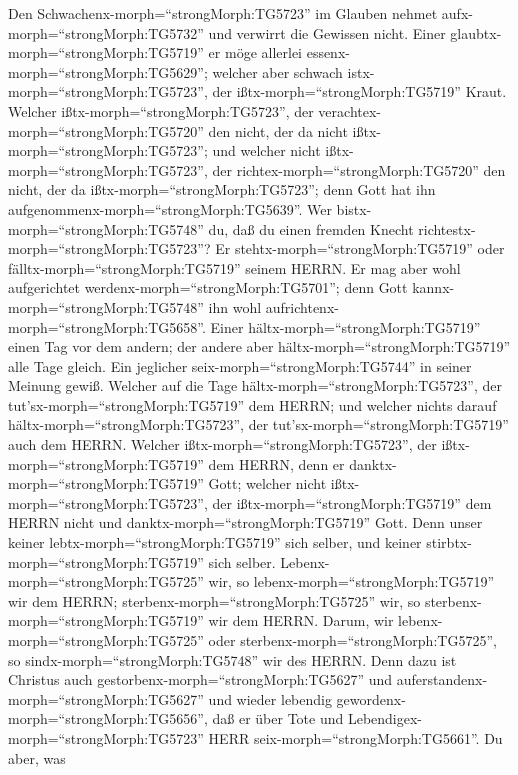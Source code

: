  Den Schwachenx-morph=``strongMorph:TG5723'' im Glauben
nehmet aufx-morph=``strongMorph:TG5732'' und verwirrt die Gewissen
nicht.  Einer glaubtx-morph=``strongMorph:TG5719'' er möge
allerlei essenx-morph=``strongMorph:TG5629''; welcher aber schwach
istx-morph=``strongMorph:TG5723'', der ißtx-morph=``strongMorph:TG5719''
Kraut.  Welcher ißtx-morph=``strongMorph:TG5723'', der
verachtex-morph=``strongMorph:TG5720'' den nicht, der da nicht
ißtx-morph=``strongMorph:TG5723''; und welcher nicht
ißtx-morph=``strongMorph:TG5723'', der
richtex-morph=``strongMorph:TG5720'' den nicht, der da
ißtx-morph=``strongMorph:TG5723''; denn Gott hat ihn
aufgenommenx-morph=``strongMorph:TG5639''.  Wer
bistx-morph=``strongMorph:TG5748'' du, daß du einen fremden Knecht
richtestx-morph=``strongMorph:TG5723''? Er
stehtx-morph=``strongMorph:TG5719'' oder
fälltx-morph=``strongMorph:TG5719'' seinem HERRN. Er mag aber wohl
aufgerichtet werdenx-morph=``strongMorph:TG5701''; denn Gott
kannx-morph=``strongMorph:TG5748'' ihn wohl
aufrichtenx-morph=``strongMorph:TG5658''.  Einer
hältx-morph=``strongMorph:TG5719'' einen Tag vor dem andern; der andere
aber hältx-morph=``strongMorph:TG5719'' alle Tage gleich. Ein jeglicher
seix-morph=``strongMorph:TG5744'' in seiner Meinung gewiß. 
Welcher auf die Tage hältx-morph=``strongMorph:TG5723'', der
tut'sx-morph=``strongMorph:TG5719'' dem HERRN; und welcher nichts darauf
hältx-morph=``strongMorph:TG5723'', der
tut'sx-morph=``strongMorph:TG5719'' auch dem HERRN. Welcher
ißtx-morph=``strongMorph:TG5723'', der ißtx-morph=``strongMorph:TG5719''
dem HERRN, denn er danktx-morph=``strongMorph:TG5719'' Gott; welcher
nicht ißtx-morph=``strongMorph:TG5723'', der
ißtx-morph=``strongMorph:TG5719'' dem HERRN nicht und
danktx-morph=``strongMorph:TG5719'' Gott.  Denn unser keiner
lebtx-morph=``strongMorph:TG5719'' sich selber, und keiner
stirbtx-morph=``strongMorph:TG5719'' sich selber. 
Lebenx-morph=``strongMorph:TG5725'' wir, so
lebenx-morph=``strongMorph:TG5719'' wir dem HERRN;
sterbenx-morph=``strongMorph:TG5725'' wir, so
sterbenx-morph=``strongMorph:TG5719'' wir dem HERRN. Darum, wir
lebenx-morph=``strongMorph:TG5725'' oder
sterbenx-morph=``strongMorph:TG5725'', so
sindx-morph=``strongMorph:TG5748'' wir des HERRN.  Denn dazu
ist Christus auch gestorbenx-morph=``strongMorph:TG5627'' und
auferstandenx-morph=``strongMorph:TG5627'' und wieder lebendig
gewordenx-morph=``strongMorph:TG5656'', daß er über Tote und
Lebendigex-morph=``strongMorph:TG5723'' HERR
seix-morph=``strongMorph:TG5661''.  Du aber, was
